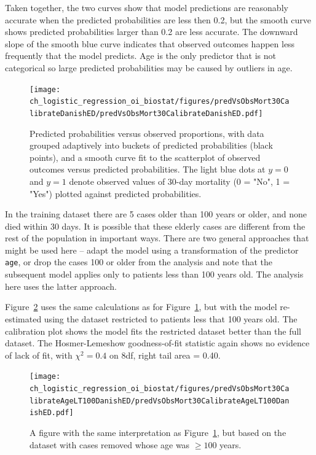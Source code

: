 Taken together, the two curves show that model predictions are reasonably accurate when the predicted probabilities are less then 0.2, but the smooth curve shows predicted probabilities larger than 0.2 are less accurate. The downward slope of the smooth blue curve indicates that observed outcomes happen less frequently that the model predicts.   Age is the only predictor that is not categorical so large predicted probabilities may be caused by outliers in age.

\begin{figure}[!tbh]
  \centering
  \texttt{[image: ch\_logistic\_regression\_oi\_biostat/figures/predVsObsMort30CalibrateDanishED/predVsObsMort30CalibrateDanishED.pdf]}
    \caption{Predicted probabilities versus observed proportions, with data grouped adaptively into buckets of predicted probabilities (black points), and a smooth curve fit to the scatterplot of observed outcomes versus predicted probabilities. The light blue dots at  $y = 0$ and $y = 1$ denote observed values of 30-day mortality (0 = "No", 1 = "Yes") plotted against predicted probabilities.}
    \label{figure:predVsObsMort30CalibrateDanishED}
\end{figure}

In the training dataset there are 5 cases older than 100 years or older, and none died within 30 days. It is possible that these elderly cases are different from the rest of the population in important ways. There are two general approaches that might be used here -- adapt the model using a transformation of the predictor \texttt{age}, or drop the cases  100 or older from the analysis and note that the subsequent model applies only to patients less than 100 years old.  The analysis here uses the latter approach.   

Figure~\ref{figure:predVsObsMort30CalibrateAgeLT100DanishED} uses the same calculations as for Figure~\ref{figure:predVsObsMort30CalibrateDanishED}, but with the model re-estimated using the dataset restricted to patients less that 100 years old. The calibration plot shows the model fits the restricted dataset better than the full dataset.  The Hosmer-Lemeshow goodness-of-fit statistic again shows no evidence of lack of fit, with $\chi^2 = 0.4$ on 8df, right tail area = 0.40.

\begin{figure}[!tbh]
  \centering
  \texttt{[image: ch\_logistic\_regression\_oi\_biostat/figures/predVsObsMort30CalibrateAgeLT100DanishED/predVsObsMort30CalibrateAgeLT100DanishED.pdf]}
    \caption{A figure with the same interpretation as Figure~\ref{figure:predVsObsMort30CalibrateDanishED}, but based on the dataset with cases removed whose age was $\ge 100$ years.}
    \label{figure:predVsObsMort30CalibrateAgeLT100DanishED}
\end{figure}

